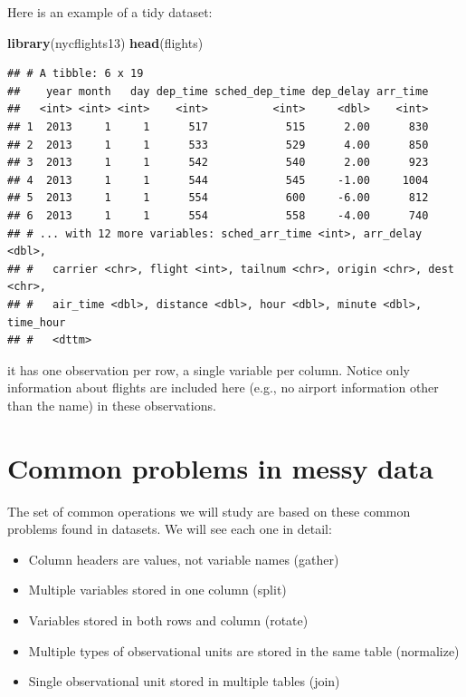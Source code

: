 \documentclass[12pt,]{book}
\newenvironment{Shaded}{\begin{snugshade}}{\end{snugshade}}
\newcommand{\KeywordTok}[1]{\textcolor[rgb]{0.13,0.29,0.53}{\textbf{#1}}}
\newcommand{\NormalTok}[1]{#1}
\providecommand{\tightlist}{%
  \setlength{\itemsep}{0pt}\setlength{\parskip}{0pt}}
\theoremstyle{definition}
\theoremstyle{definition}
\theoremstyle{definition}
\theoremstyle{remark}
\begin{document}
Here is an example of a tidy dataset:

\begin{Shaded}
\begin{Highlighting}[]
\KeywordTok{library}\NormalTok{(nycflights13)}
\KeywordTok{head}\NormalTok{(flights)}
\end{Highlighting}
\end{Shaded}

\begin{verbatim}
## # A tibble: 6 x 19
##    year month   day dep_time sched_dep_time dep_delay arr_time
##   <int> <int> <int>    <int>          <int>     <dbl>    <int>
## 1  2013     1     1      517            515      2.00      830
## 2  2013     1     1      533            529      4.00      850
## 3  2013     1     1      542            540      2.00      923
## 4  2013     1     1      544            545     -1.00     1004
## 5  2013     1     1      554            600     -6.00      812
## 6  2013     1     1      554            558     -4.00      740
## # ... with 12 more variables: sched_arr_time <int>, arr_delay <dbl>,
## #   carrier <chr>, flight <int>, tailnum <chr>, origin <chr>, dest <chr>,
## #   air_time <dbl>, distance <dbl>, hour <dbl>, minute <dbl>, time_hour
## #   <dttm>
\end{verbatim}

it has one observation per row, a single variable per column. Notice
only information about flights are included here (e.g., no airport
information other than the name) in these observations.

\section{Common problems in messy
data}\label{common-problems-in-messy-data}

The set of common operations we will study are based on these common
problems found in datasets. We will see each one in detail:

\begin{itemize}
\tightlist
\item
  Column headers are values, not variable names (gather)\\
\item
  Multiple variables stored in one column (split)\\
\item
  Variables stored in both rows and column (rotate)\\
\item
  Multiple types of observational units are stored in the same table
  (normalize)\\
\item
  Single observational unit stored in multiple tables (join)
\end{itemize}
\end{document}

